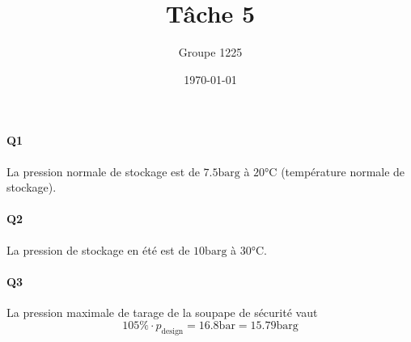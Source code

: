 \documentclass[a4paper,oneside,12pt]{article}
\title{T\^ache 5}
\author{Groupe 1225}
\date{\today}
\newcommand{\barg}{\si{\bar}\text{g}}
\begin{document}
\maketitle

\paragraph{Q1} La pression normale de stockage est de $7.5 \barg$ à $20\si{\celsius}$ 
(température normale de stockage).

\paragraph{Q2} La pression de stockage en été est de $10 \barg$ à $30\si{\celsius}$.

\paragraph{Q3} La pression maximale de tarage de la soupape de sécurité vaut 
\[ 105\% \cdot p_{\text{design}} = 16.8\si{\bar} = 15.79\barg \]



\end{document}
